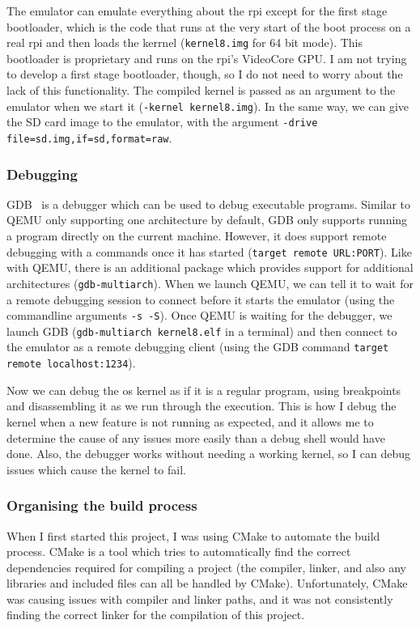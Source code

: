 \documentclass{article}
\begin{document}
The emulator can emulate everything about the \gls{rpi} except for the first
stage bootloader, which is the code that runs at the very start of the boot
process on a real \gls{rpi} and then loads the kerrnel (\texttt{kernel8.img}
for 64 bit mode). This bootloader is proprietary and runs on the \gls{rpi}'s
VideoCore GPU. I am not trying to develop a first stage bootloader, though, so
I do not need to worry about the lack of this functionality. The compiled
kernel is passed as an argument to the emulator when we start it
(\texttt{-kernel kernel8.img}). In the same way, we can give the SD card image
to the emulator, with the argument \texttt{-drive
file=sd.img,if=sd,format=raw}.

\subsubsection{Debugging}
GDB~\cite{gdb} is a debugger which can be used to debug executable programs.
Similar to QEMU only supporting one architecture by default, GDB only supports
running a program directly on the current machine. However, it does support
remote debugging with a commands once it has started (\texttt{target remote
URL:PORT}). Like with QEMU, there is an additional package which provides
support for additional architectures (\texttt{gdb-multiarch}). When we launch
QEMU, we can tell it to wait for a remote debugging session to connect before
it starts the emulator (using the commandline arguments \texttt{-s -S}). Once
QEMU is waiting for the debugger, we launch GDB (\texttt{gdb-multiarch
kernel8.elf} in a terminal) and then connect to the emulator as a remote
debugging client (using the GDB command \texttt{target remote localhost:1234}).

Now we can debug the \gls{os} kernel as if it is a regular program, using
breakpoints and disassembling it as we run through the execution. This is how I
debug the kernel when a new feature is not running as expected, and it allows
me to determine the cause of any issues more easily than a debug shell would
have done. Also, the debugger works without needing a working kernel, so I can
debug issues which cause the kernel to fail.

\subsubsection{Organising the build process}
When I first started this project, I was using CMake to automate the build
process. CMake is a tool which tries to automatically find the correct
dependencies required for compiling a project (the compiler, linker, and also
any libraries and included files can all be handled by CMake). Unfortunately,
CMake was causing issues with compiler and linker paths, and it was not
consistently finding the correct linker for the compilation of this project.
\end{document}
